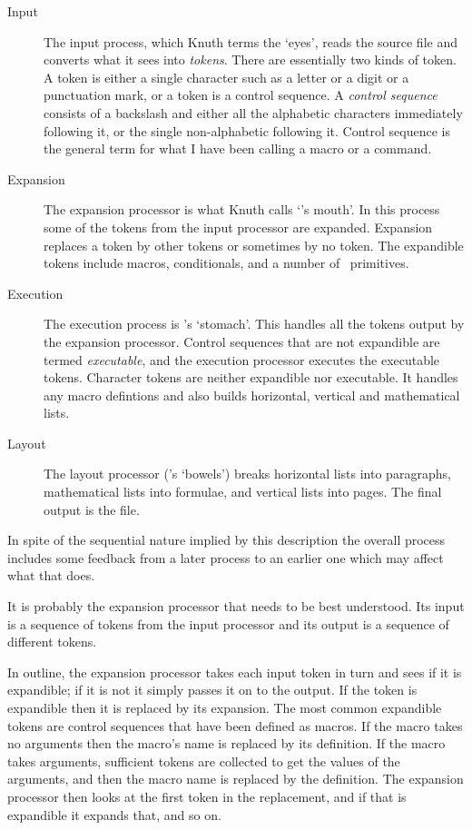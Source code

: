 \begin{description}
\item[Input] The input process, which Knuth terms the `eyes', reads
  the source file and converts what it sees into \emph{tokens}.
  There are essentially two kinds of token. A token is either a single
  character such as a letter or a digit or a punctuation mark, or 
  a token is a control sequence. 
  A \emph{control sequence} consists of a backslash
  and either all the alphabetic characters immediately following it, or
  the single non-alphabetic following it. Control sequence is the general 
  term for what I have been calling a macro or a command.

\item[Expansion] The expansion processor is what Knuth calls `\tx's mouth'.
  In this process some of the tokens from the input processor are expanded.
  Expansion replaces a token by other tokens or sometimes by no token.
  The expandible tokens include macros, conditionals, and a number of
  \tx\ primitives. 

\item[Execution] The execution process is \tx's `stomach'. This handles
  all the tokens output by the expansion processor. Control sequences
  that are not expandible are termed \emph{executable}, and the execution
  processor executes the executable tokens. Character tokens are
  neither expandible nor executable. It handles any macro defintions
  and also builds horizontal, vertical and mathematical lists.

\item[Layout] The layout processor (\tx's `bowels') breaks horizontal 
  lists into paragraphs, mathematical lists into formulae, and 
  vertical lists into pages. The final output is the  file.

\end{description}

    In spite of the sequential nature implied by this description the 
overall process includes some feedback from a later process to an 
earlier one which may affect what that does.

    It is probably the expansion processor that needs to be best understood.
Its input is a sequence of tokens from the input processor and its output
is a sequence of different tokens.

    In outline, the expansion processor takes each input token in turn
and sees if it is expandible; if it is not it simply passes it on to the
output. If the token is expandible then it is replaced by its expansion.
The most common expandible tokens are control sequences that have been 
defined as macros. If the macro takes no arguments then the macro's name
is replaced by its definition. If the macro takes arguments, sufficient 
tokens are collected to get the values of the arguments, and then the 
macro name is replaced by the definition. The expansion processor then
looks at the first token in the replacement, and if that is expandible
it expands that, and so on. 

